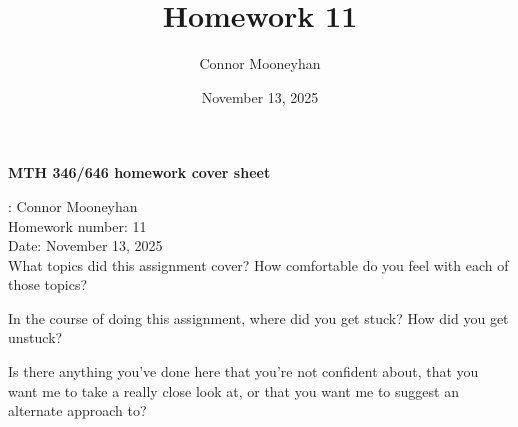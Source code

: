 \documentclass[12pt]{article}
\title{Homework 11}
\author{Connor Mooneyhan}
\date{November 13, 2025}
\theoremstyle{definition}
\begin{document}
\begin{center}
	{\bf\Large MTH 346/646 homework cover sheet}
\end{center}

\vspace{0.5in}

: Connor Mooneyhan \\
{\large Homework number}: 11 \\
{\large Date}: November 13, 2025 \\

{\Large What topics did this assignment cover? How comfortable do you feel with
each of those topics?}


\vspace{1.75in}

{\Large In the course of doing this assignment, where did you get stuck?
	How did you get unstuck?}


\vspace{1.75in}

{\Large Is there anything you've done here that you're not confident about, that you want me to take a really close look at, or that you want me to suggest an alternate approach to?}


\pagebreak
\end{document}
